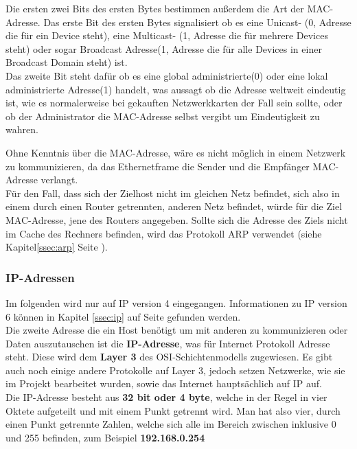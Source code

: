 \documentclass[12pt,a4paper]{report}
\begin{document}
Die ersten zwei Bits des ersten Bytes bestimmen außerdem die Art der MAC-Adresse. Das erste Bit des ersten Bytes signalisiert ob es eine Unicast- (0, Adresse die für ein Device steht), eine Multicast- (1, Adresse die für mehrere Devices steht) oder sogar Broadcast Adresse(1, Adresse die für alle Devices in einer Broadcast Domain steht) ist.\\
Das zweite Bit steht dafür ob es eine global administrierte(0) oder eine lokal administrierte Adresse(1) handelt, was aussagt ob die Adresse weltweit eindeutig ist, wie es normalerweise bei gekauften Netzwerkkarten der Fall sein sollte, oder ob der Administrator die MAC-Adresse selbst vergibt um Eindeutigkeit zu wahren.

Ohne Kenntnis über die MAC-Adresse, wäre es nicht möglich in einem Netzwerk zu kommunizieren, da das Ethernetframe die Sender und die Empfänger MAC-Adresse verlangt.\\
Für den Fall, dass sich der Zielhost nicht im gleichen Netz befindet, sich also in einem durch einen Router getrennten, anderen Netz befindet, würde für die Ziel MAC-Adresse, jene des Routers angegeben. Sollte sich die Adresse des Ziels nicht im Cache des Rechners befinden, wird das Protokoll ARP verwendet (siehe Kapitel\ref{ssec:arp} Seite \pageref{ssec:arp}). 
\subsubsection{IP-Adressen}\label{sssec:ipaddr}
Im folgenden wird nur auf IP version 4 eingegangen. Informationen zu IP version 6 können in Kapitel \ref{ssec:ip} auf Seite \pageref{ssec:ip} gefunden werden.\\

Die zweite Adresse die ein Host benötigt um mit anderen zu kommunizieren oder Daten auszutauschen ist die \textbf{IP-Adresse}, was für Internet Protokoll Adresse steht. Diese wird dem \textbf{Layer 3} des OSI-Schichtenmodells zugewiesen. Es gibt auch noch einige andere Protokolle auf Layer 3, jedoch setzen Netzwerke, wie sie im Projekt bearbeitet wurden, sowie das Internet hauptsächlich auf IP auf.\\

Die IP-Adresse besteht aus \textbf{32 bit oder 4 byte}, welche in der Regel in vier Oktete aufgeteilt und mit einem Punkt getrennt wird. Man hat also vier, durch einen Punkt getrennte Zahlen, welche sich alle im Bereich zwischen inklusive 0 und 255 befinden, zum Beispiel \textbf{192.168.0.254}\\
\end{document}
